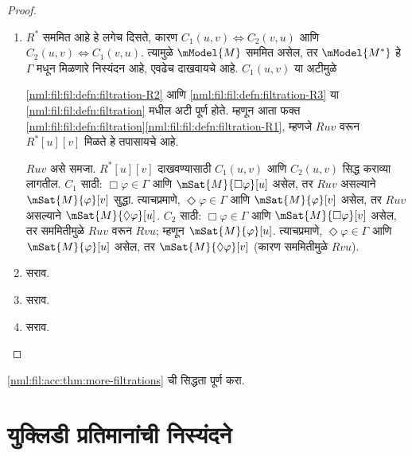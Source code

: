 \begin{proof}
  \begin{enumerate}
    \item $R^*$ सममित आहे हे लगेच दिसते, कारण $C_1(u,v)
      \Leftrightarrow C_2(v,u)$ आणि $C_2(u,v) \Leftrightarrow
      C_1(v,u)$. त्यामुळे $\mModel{M}$ सममित असेल,
      तर $\mModel{M^*}$ हे $\Gamma$ मधून मिळणारे
      निस्यंदन आहे, एवढेच दाखवायचे आहे.
      $C_1(u,v)$ या अटीमुळे


          \ref{nml:fil:fil:defn:filtration-R2} आणि
          \ref{nml:fil:fil:defn:filtration-R3} या
          \ref{nml:fil:fil:defn:filtration} मधील अटी
      पूर्ण होते. म्हणून आता फक्त
      \ref{nml:fil:fil:defn:filtration}\ref{nml:fil:fil:defn:filtration-R1},
      म्हणजे $Ruv$ वरून $R^*[u][v]$ मिळते हे तपासायचे आहे.

      $Ruv$ असे समजा. $R^*[u][v]$ दाखवण्यासाठी
      $C_1(u,v)$ आणि $C_2(u,v)$ सिद्ध कराव्या लागतील.
      $C_1$ साठी: $\Box\varphi
        \in\Gamma$ आणि $\mSat{M}{\Box\varphi}[u]$ असेल,
        तर $Ruv$ असल्याने $\mSat{M}{\varphi}[v]$ सुद्धा.
         त्याचप्रमाणे,
        $\Diamond\varphi \in \Gamma$
        आणि $\mSat{M}{\varphi}[v]$ असेल, तर $Ruv$
        असल्याने $\mSat{M}{\Diamond\varphi}[u]$.
      $C_2$ साठी: $\Box\varphi \in \Gamma$
        आणि $\mSat{M}{\Box\varphi}[v]$ असेल, तर सममितीमुळे
        $Ruv$ वरून $Rvu$; म्हणून $\mSat{M}{\varphi}[u]$.
         त्याचप्रमाणे,
        $\Diamond\varphi \in\Gamma$
        आणि $\mSat{M}{\varphi}[u]$ असेल, तर
        $\mSat{M}{\Diamond\varphi}[v]$ (कारण सममितीमुळे $Rvu$).
    \item सराव.
    \item सराव.
    \item सराव.
  \end{enumerate}
\end{proof}

\begin{prob}
  \ref{nml:fil:acc:thm:more-filtrations} ची सिद्धता पूर्ण करा.
\end{prob}













\section{युक्लिडी प्रतिमानांची निस्यंदने}\label{nml:fil:euc:sec}

